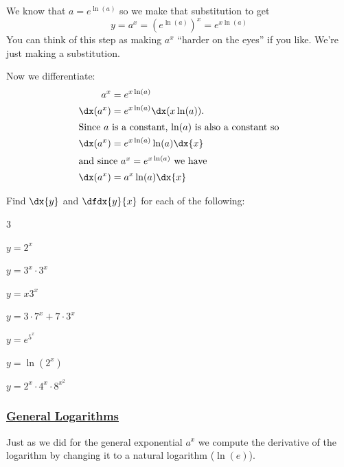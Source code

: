 We know that $a=e^{\ln(a)}$ so we make that substitution to get
$$
y=a^x=\left(e^{\ln(a)}\right)^x=e^{x\ln(a)}
$$
You can think of this step as making $a^x$ ``harder on the eyes'' if
you like. We're just making a substitution.

Now we differentiate:
\begin{align*}
  a^x&=e^{x\ln(a)}\\
  \dx(a^x) &= e^{x\ln(a)}\dx(x\ln(a)).\\
  \intertext{Since $a$ is a constant, $\ln(a)$ is also a constant so}
  \dx(a^x) &= e^{x\ln(a)}\ln(a)\dx{x}\\
  \intertext{and since $a^x=e^{x\ln(a)}$ we have}
    \dx(a^x) &= a^x\ln(a)\dx{x}\\
\end{align*}

\begin{ProficiencyDrill}
  Find $\dx{y}$ and $\dfdx{y}{x}$ for each of the following:
  \begin{enumerate}[label={\bf{}(\alph*)}]
    \begin{multicols}{3}
    \item $y=2^x$
    \item $y=3^x\cdot3^x$
    \item $y=x3^x$
    \item $y=3\cdot7^x+7\cdot3^x$
    \item $y=e^{5^x}$
    \item $y=\ln\left(2^x\right)$
    \item $y=2^x\cdot4^x\cdot8^{x^2}$
    \end{multicols}
  \end{enumerate}
\end{ProficiencyDrill}

\subsubsection*{\underline{General Logarithms}}
Just as we did for the general exponential $a^x$ we compute the
derivative of the logarithm by changing it to a natural logarithm
($\ln(e)$).

